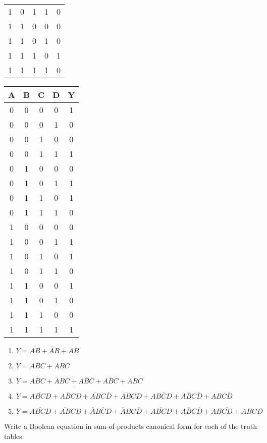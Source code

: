 \begin{tasks}
\begin{tabular}{cccc|c}
	1&0&1&1&0\\
	1&1&0&0&0\\
	1&1&0&1&0\\
	1&1&1&0&1\\
	1&1&1&1&0
\end{tabular}
\task
\begin{tabular}{cccc|c}
	A & B & C & D & Y\\
	\hline
	0&0&0&0&1\\
	0&0&0&1&0\\
	0&0&1&0&0\\
	0&0&1&1&1\\
	0&1&0&0&0\\
	0&1&0&1&1\\
	0&1&1&0&1\\
	0&1&1&1&0\\
	1&0&0&0&0\\
	1&0&0&1&1\\
	1&0&1&0&1\\
	1&0&1&1&0\\
	1&1&0&0&1\\
	1&1&0&1&0\\
	1&1&1&0&0\\
	1&1&1&1&1
\end{tabular}
\end{tasks}

\solution
\begin{enumerate}[label=(\alph*)]
	\item $Y=\overline{AB}+\overline{A}B+AB$
	\item $Y=\overline{ABC}+ABC$
	\item $Y=\overline{ABC}+\overline{A}B\overline{C}+
	A\overline{B}\overline{C}+A\overline{B}C+ABC$
	\item $Y=\overline{ABCD}+\overline{ABC}D+\overline{AB}C\overline{D}+\overline{AB}CD
	+A\overline{BCD}+A\overline{B}C\overline{D}+ABC\overline{D}$
	\item $Y=\overline{ABCD}+\overline{AB}CD+\overline{A}B\overline{C}D+
	\overline{A}BC\overline{D}+A\overline{BC}D+A\overline{B}C\overline{D}
	+AB\overline{CD}+ABCD$
\end{enumerate}	

\clearpage
\exercise %
Write a Boolean equation in sum-of-products canonical form
for each of the truth tables.

